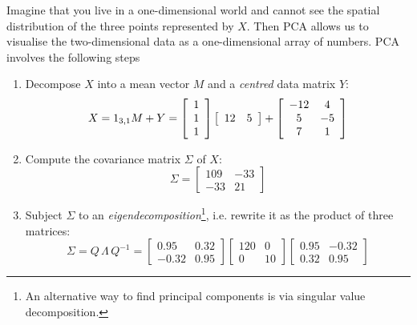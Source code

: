 Imagine that you live in a one-dimensional world and cannot see the
spatial distribution of the three points represented by $X$. Then PCA
allows us to visualise the two-dimensional data as a one-dimensional
array of numbers. PCA involves the following steps
\begin{enumerate}
\item Decompose $X$ into a mean vector $M$ and a \emph{centred} data
  matrix $Y$:
  \begin{equation}
    X = 1_{3,1} M + Y =
    \left[
      \begin{array}{c}
        1 \\
        1 \\
        1
      \end{array}
      \right]
    \left[
      \begin{array}{cc}
        12 & 5
      \end{array}
      \right]
    +
    \left[
      \begin{array}{cc}
        -12 &  4 \cr
          5 & -5 \cr
          7 &  1
      \end{array}
      \right]
    \label{eq:XMY}
  \end{equation}

\item Compute the covariance matrix $\Sigma$ of $X$:
  \begin{equation}
    \Sigma =
    \left[
      \begin{array}{cc}
        109 & -33 \\
        -33 &  21
      \end{array}
      \right]
  \end{equation}

\item Subject $\Sigma$ to an \emph{eigendecomposition}\footnote{An
alternative way to find principal components is via singular value
decomposition.}, i.e. rewrite it as the product of three matrices:
  \begin{equation}
    \Sigma = Q \, \Lambda \, Q^{-1} =
    \left[
      \begin{array}{cc}
         0.95 & 0.32 \\
        -0.32 & 0.95
      \end{array}
      \right]
    \left[
      \begin{array}{cc}
        120 & 0 \\
        0 & 10
      \end{array}
      \right]
    \left[
      \begin{array}{cc}
        0.95 & -0.32 \\
        0.32 & 0.95
      \end{array}
      \right]
    \label{eq:eigen}
  \end{equation}


\end{enumerate}
